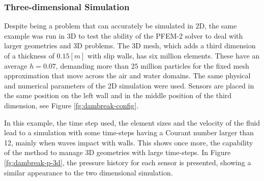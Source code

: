 \clearpage

\subsubsection{Three-dimensional Simulation}\label{sec:ETSIN-3d}

Despite being a problem that can accurately be simulated in 2D, the same example was run in 3D to test the ability of the PFEM-2 solver to deal with larger geometries and 3D problems. The 3D mesh, which adds a third dimension of a thickness of $0.15[m]$ with slip walls, has six million elements. These have an average $h=0.07$, demanding more than $25$ million particles for the fixed mesh approximation that move \textcolor[rgb]{1.00,0.00,0.00}{across} the air and water domains. The same physical and numerical parameters of the 2D simulation were used. Sensors are placed in the same position on the left wall and in the middle position of the third dimension, see Figure \ref{fg:dambreak-config}.

In this example, the time step used, the element sizes and the velocity of the fluid lead to a simulation with some time-steps having a Courant number larger than 12, mainly when waves impact with walls. This shows once more, the capability of the method to manage 3D geometries with large time-steps. In Figure \ref{fg:dambreak-p-3d}, the pressure history for each sensor is presented, showing a similar appearance to the two dimensional simulation.

